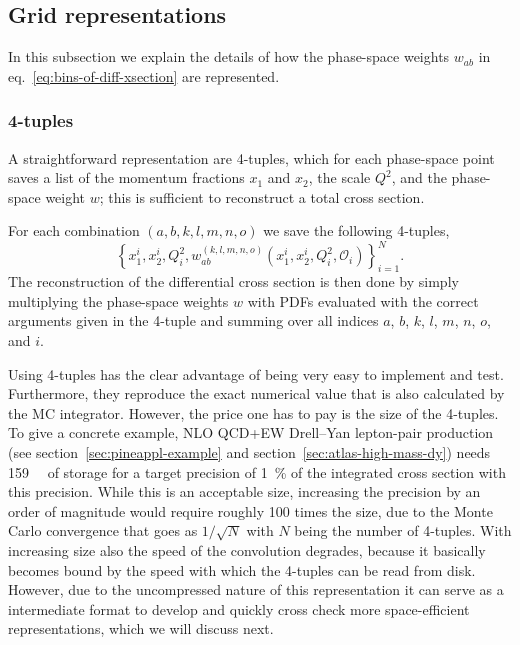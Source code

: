 \subsection{Grid representations}
\label{sec:grid-representation}

In this subsection we explain the details of how the phase-space weights $w_{ab}$ in eq.~\eqref{eq:bins-of-diff-xsection} are represented.

\subsubsection{4-tuples}

A straightforward representation are 4-tuples, which for each phase-space point saves a list of the momentum fractions $x_1$ and $x_2$, the scale $Q^2$, and the phase-space weight $w$; this is sufficient to reconstruct a total cross section.

For each combination $(a,b,k,l,m,n,o)$ we save the following 4-tuples,
\begin{equation}
\left\{ x_1^i, x_2^i, Q^2_i, w^{(k,l,m,n,o)}_{ab} (x_1^i, x_2^i, Q^2_i, \mathcal{O}_i) \right\}_{i=1}^N \text{.} \label{eq:four-tuples}
\end{equation}
The reconstruction of the differential cross section is then done by simply multiplying the phase-space weights $w$ with PDFs evaluated with the correct arguments given in the 4-tuple and summing over all indices $a$, $b$, $k$, $l$, $m$, $n$, $o$, and $i$.

Using 4-tuples has the clear advantage of being very easy to implement and test.
Furthermore, they reproduce the exact numerical value that is also calculated by the MC integrator.
However, the price one has to pay is the size of the 4-tuples.
To give a concrete example, NLO QCD+EW Drell--Yan lepton-pair production (see section~\ref{sec:pineappl-example} and section~\ref{sec:atlas-high-mass-dy}) needs \SI{159}{\giga\byte} of storage for a target precision of \SI{1}{\percent} of the integrated cross section with this precision.
While this is an acceptable size, increasing the precision by an order of magnitude would require roughly 100 times the size, due to the Monte Carlo convergence that goes as $1/\sqrt{N}$ with $N$ being the number of 4-tuples.
With increasing size also the speed of the convolution degrades, because it basically becomes bound by the speed with which the 4-tuples can be read from disk.
However, due to the uncompressed nature of this representation it can serve as a intermediate format to develop and quickly cross check more space-efficient representations, which we will discuss next.

